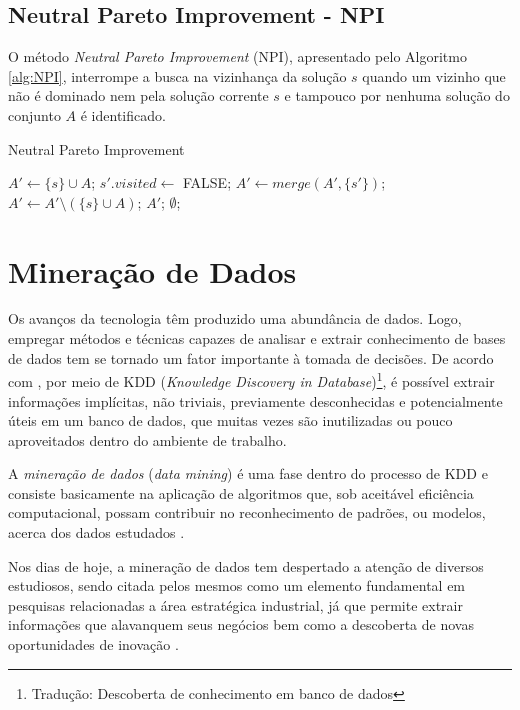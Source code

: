 \documentclass[
	12pt,				%
	openany,			%
	oneside,	
	a4paper,			%
	brazil,				%
	]{unimontes-ppgmsc-abntex2}
\begin{document}
\subsection{Neutral Pareto Improvement - NPI} 

O método {\em Neutral Pareto Improvement} (NPI), apresentado pelo Algoritmo \ref{alg:NPI}, interrompe a busca na vizinhança da solução $s$ quando um vizinho que não é dominado nem pela solução corrente $s$ e tampouco por nenhuma solução do conjunto $A$ é identificado.

\begin{algorithm}[H]
\caption{Neutral Pareto Improvement}
\label{alg:NPI}
\begin{algorithmic}[1]
\State $A' \leftarrow \{s\} \cup A$;
    \State $s'.visited \leftarrow$ FALSE;
    \State $A' \leftarrow merge(A', \{s'\})$;
    \State $A' \leftarrow A' \setminus (\{s\} \cup A)$;
    \State \Return $A'$;
  \EndIf
\EndFor
\State \Return $\emptyset$;
\end{algorithmic}
\end{algorithm}

\section{Mineração de Dados}
\label{sec:md}

Os avanços da tecnologia têm produzido uma abundância de dados. Logo, empregar métodos e técnicas capazes de analisar e extrair conhecimento de bases de dados tem se tornado um fator importante à tomada de decisões. De acordo com , por meio de KDD ({\em Knowledge Discovery in Database})\footnote{Tradução: Descoberta de conhecimento em banco de dados}, é possível extrair informações implícitas, não triviais, previamente desconhecidas e potencialmente úteis em um banco de dados, que muitas vezes são inutilizadas ou pouco aproveitados dentro do ambiente de trabalho. 

A {\em mineração de dados} ({\em data mining}) é uma fase dentro do processo de KDD e consiste basicamente na aplicação de algoritmos que, sob aceitável eficiência computacional, possam contribuir no reconhecimento de padrões, ou modelos, acerca dos dados estudados \cite{Fayyad_1996_2}. 

Nos dias de hoje, a mineração de dados tem despertado a atenção de diversos estudiosos, sendo citada pelos mesmos como um elemento fundamental em pesquisas relacionadas a área estratégica industrial, já que permite extrair informações que alavanquem seus negócios bem como a descoberta de novas oportunidades de inovação \cite{Chen_1996}.
\end{document}
